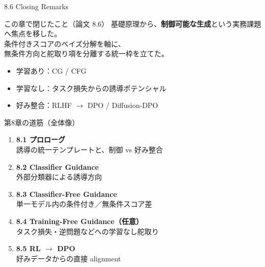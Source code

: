 

\begin{frame}{8.6 Closing Remarks}
    \begin{block}{この章で閉じたこと（論文 8.6）}
        基礎原理から、\textbf{制御可能な生成}という実務課題へ焦点を移した。\\
        条件付きスコアのベイズ分解を軸に、\\
        無条件方向と舵取り項を分離する統一枠を立てた。
    \end{block}
    \begin{itemize}
        \item 学習あり：CG / CFG
        \item 学習なし：タスク損失からの誘導ポテンシャル
        \item 好み整合：RLHF $\to$ DPO / Diffusion-DPO
    \end{itemize}
\end{frame}
\asmain
\begin{frame}{第8章の道筋（全体像）}
    \begin{enumerate}
        \item \textbf{8.1 プロローグ}\\
        誘導の統一テンプレートと、制御 vs 好み整合
        \item \textbf{8.2 Classifier Guidance}\\
        外部分類器による誘導方向
        \item \textbf{8.3 Classifier-Free Guidance}\\
        単一モデル内の条件付き／無条件スコア差
        \item \textbf{8.4 Training-Free Guidance（任意）}\\
        タスク損失・逆問題などへの学習なし舵取り
        \item \textbf{8.5 RL $\to$ DPO}\\
        好みデータからの直接 alignment
    \end{enumerate}
\end{frame}
\asmain
